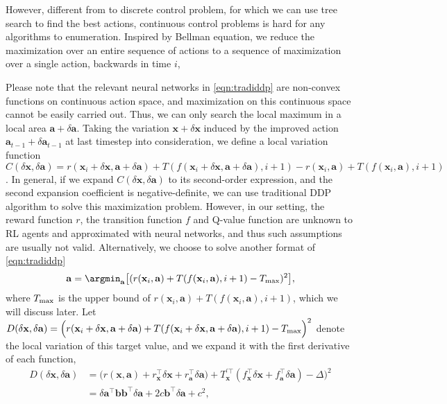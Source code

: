 \documentclass{article} %
\begin{document}
However, different from to discrete control problem, for which we can use tree search to find the best actions, continuous control problems is hard for any algorithms to enumeration. Inspired by Bellman equation, we reduce the maximization over an entire sequence of actions to a sequence of maximization over a single action, backwards in time $i$,


Please note that the relevant neural networks in \eqref{eqn:tradiddp} are non-convex functions on continuous action space, and maximization on this continuous space cannot be easily carried out. Thus, we can only search the local maximum in a local area $\mathbf{a} + \delta \mathbf{a}$. Taking the variation $\mathbf{x} + \delta \mathbf{x}$ induced by the improved action $\mathbf{a}_{t-1} + \delta \mathbf{a}_{t-1} $ at last timestep into consideration, we define a local variation function  $C(\delta \mathbf{x}, \delta \mathbf{a}) = r(\mathbf{x}_i +\delta \mathbf{x}, \mathbf{a} + \delta \mathbf{a}) + T(f(\mathbf{x}_i +\delta \mathbf{x}, \mathbf{a}+ \delta \mathbf{a}), i+1) - r(\mathbf{x}_i, \mathbf{a}) + T(f(\mathbf{x}_i, \mathbf{a}),i+1)$. In general, if we expand $C(\delta \mathbf{x}, \delta \mathbf{a})$ to its second-order expression, and the second expansion coefficient is negative-definite, we can use traditional DDP algorithm \citep{tassa2012synthesis} to solve this maximization problem. However, in our setting, the reward function $r$, the transition function $f$ and Q-value function are unknown to RL agents and approximated with neural networks, and thus such assumptions are usually not valid. Alternatively, we choose to solve another format of \eqref{eqn:tradiddp}
\begin{equation}\label{eqn:oursddp}
    \mathbf{a} = \argmin_{\mathbf{a}}\big[(r(\mathbf{x}_i, \mathbf{a}) +  T(f(\mathbf{x}_i, \mathbf{a}), i+1) - T_{\textnormal{max}})^2  \big],
\end{equation}
where $T_{\textnormal{max}}$ is the upper bound of $r(\mathbf{x}_i, \mathbf{a}) +  T(f(\mathbf{x}_i, \mathbf{a}), i+1)$, which we will discuss later. Let $D(\delta \mathbf{x}, \delta \mathbf{a}) = \Big( r(\mathbf{x}_i + \delta \mathbf{x}, \mathbf{a}+ \delta \mathbf{a}) + T(f(\mathbf{x}_i+ \delta \mathbf{x}, \mathbf{a} + \delta \mathbf{a}), i+1) - T_{\textnormal{max}} \Big)^2$ denote the local variation of this target value, and we expand it with the first derivative of each function,
\begin{equation}
\begin{aligned}
    D(\delta \mathbf{x}, \delta \mathbf{a})&=\Big(r(\mathbf{x}, \mathbf{a}) + r_{\mathbf{x}}^{\top}\delta \mathbf{x} + r_{\mathbf{a}}^{\top} \delta \mathbf{a}) + T_{\mathbf{x}}^{\prime \top}( f_{\mathbf{x}}^{\top}\delta \mathbf{x} + f_{\mathbf{a}}^{\top} \delta \mathbf{a}) - \Delta\Big)^2 \\ 
    &=\delta \mathbf{a}^\top \mathbf{b} \mathbf{b}^\top \delta \mathbf{a} + 2c\mathbf{b}^\top \delta \mathbf{a} + c^2,
\end{aligned}
\end{equation}
\end{document}
